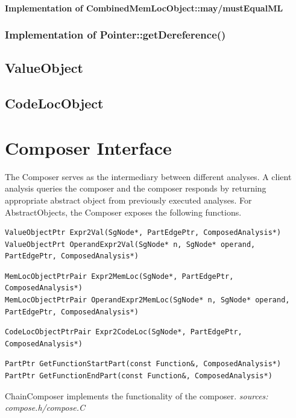 \documentclass{article}
\begin{document}
\paragraph{Implementation of CombinedMemLocObject::may/mustEqualML}

\subsubsection{Implementation of Pointer::getDereference()}


\subsection{ValueObject}
\subsection{CodeLocObject}

\section{Composer Interface}
The Composer serves as the intermediary between different analyses.  A
client analysis queries the composer and the composer responds by
returning appropriate abstract object from previously executed
analyses. For AbstractObjects, the Composer exposes the following functions.
\begin{lstlisting}
ValueObjectPtr Expr2Val(SgNode*, PartEdgePtr, ComposedAnalysis*)
ValueObjectPrt OperandExpr2Val(SgNode* n, SgNode* operand,
PartEdgePtr, ComposedAnalysis*)
\end{lstlisting}

\begin{lstlisting}
MemLocObjectPtrPair Expr2MemLoc(SgNode*, PartEdgePtr, ComposedAnalysis*)
MemLocObjectPtrPair OperandExpr2MemLoc(SgNode* n, SgNode* operand,
PartEdgePtr, ComposedAnalysis*)
\end{lstlisting}

\begin{lstlisting}
CodeLocObjectPtrPair Expr2CodeLoc(SgNode*, PartEdgePtr,
ComposedAnalysis*)
\end{lstlisting}

\begin{lstlisting}
PartPtr GetFunctionStartPart(const Function&, ComposedAnalysis*)
PartPtr GetFunctionEndPart(const Function&, ComposedAnalysis*)
\end{lstlisting}

\noindent ChainComposer implements the functionality of the composer.
\emph{sources: compose.h/compose.C}
\end{document}
